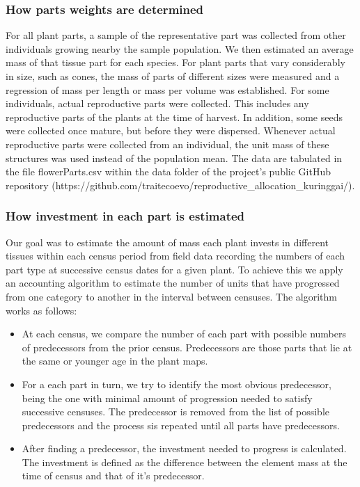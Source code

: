 \documentclass[10pt,twoside]{article}\usepackage[]{graphicx}\usepackage[]{color}
\begin{document}
\subsubsection{How parts weights are determined}

For all plant parts, a sample of the representative part was collected from other individuals growing nearby the sample population. We then estimated an average mass of that tissue part for each species. For plant parts that vary considerably in size, such as cones, the mass of parts of different sizes were measured and a regression of mass per length or mass per volume was established. For some individuals, actual reproductive parts were collected. This includes any reproductive parts of the plants at the time of harvest. In addition, some seeds were collected once mature, but before they were dispersed. Whenever actual reproductive parts were collected from an individual, the unit mass of these structures was used instead of the population mean. The data are tabulated in the file flowerParts.csv within the data folder of the project's public GitHub repository (https://github.com/traitecoevo/reproductive_allocation_kuringgai/).

\subsubsection{How investment in each part is estimated}


Our goal was to estimate the amount of mass each plant invests in different tissues within each census period from field data recording the numbers of each part type at successive census dates for a given plant. To achieve this we apply an accounting algorithm to estimate the number of units that have progressed from one category to another in the interval between censuses. The algorithm works as follows:

\begin{itemize}
\item At each census, we compare the number of each part with possible numbers of predecessors from the prior census. Predecessors are those parts that lie at the same or younger age in the plant maps.
\item For a each part in turn, we try to identify the most obvious predecessor, being the one with minimal amount of progression needed to satisfy successive censuses. The predecessor is removed from the list of possible predecessors and the process sis repeated until all parts have predecessors.
\item After finding a predecessor, the investment needed to progress  is calculated. The investment is defined as the difference between the element mass at the time of census and that of it's predecessor.
\end{itemize}
\end{document}
